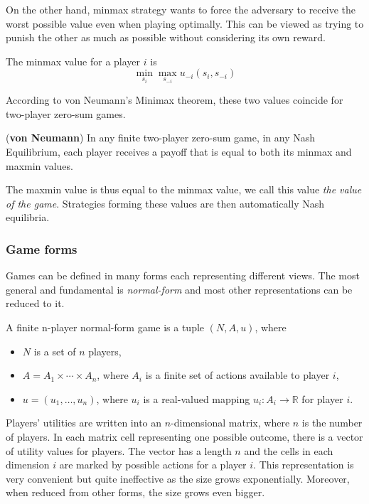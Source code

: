 \documentclass[../main.tex]{subfiles}
\begin{document}
On the other hand, minmax strategy wants to force the adversary to receive the worst possible value even when playing optimally.
This can be viewed as trying to punish the other as much as possible without considering its own reward.
\begin{definition}\label{bg:g:basics:minimax:minmax}
    The minmax value for a player $i$ is
    \[
        \min_{s_i} \max_{s_{-i}} u_{-i}(s_i, s_{-i})
    \]
\end{definition}
According to von Neumann's Minimax theorem, these two values coincide for two-player zero-sum games.
\begin{theorem}\label{bg:g:basics:minimax:minimax}
    (\textbf{von Neumann}\cite{minimax}) In any finite two-player zero-sum game, in any Nash Equilibrium, each player receives a payoff that is equal to both its minmax and maxmin values.
\end{theorem}
The maxmin value is thus equal to the minmax value, we call this value \textit{the value of the game}.
Strategies forming these values are then automatically Nash equilibria.

\subsubsection{Game forms}\label{bg:g:basics:forms}
Games can be defined in many forms each representing different views.
The most general and fundamental is \textit{normal-form} and most other representations can be reduced to it.
\begin{definition}\label{bg:g:basics:forms:normal}
    A finite n-player normal-form game is a tuple $\left(N, A, u\right)$, where
    \begin{itemize}
        \item $N$ is a set of $n$ players,
        \item $A = A_1 \times \cdots \times A_n$, where $A_i$ is a finite set of actions available to player $i$,
        \item $u = (u_1, \dots, u_n)$, where $u_i$ is a real-valued mapping $u_i : A_i \to \mathbb{R}$ for player $i$.
    \end{itemize}
\end{definition}
Players' utilities are written into an $n$-dimensional matrix, where $n$ is the number of players.
In each matrix cell representing one possible outcome, there is a vector of utility values for players.
The vector has a length $n$ and the cells in each dimension $i$ are marked by possible actions for a player $i$.
This representation is very convenient but quite ineffective as the size grows exponentially.
Moreover, when reduced from other forms, the size grows even bigger.
\end{document}
